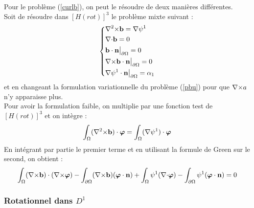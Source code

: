 Pour le problème (\ref{curlb}), on peut le résoudre de deux manières différentes.\\
Soit de résoudre dans $[H(rot)]^3$ le problème mixte suivant : 
\begin{equation}\label{pbbcurl}
\left\{\begin{aligned}
&{\nabla^2\times} \mathbf{b} = {\nabla}\psi^1\\
&{\nabla\cdot} \mathbf{b} = 0\\
&\mathbf{b}\cdot \mathbf{n}{\big\rvert_{\partial\Omega}} = 0\\
&{\nabla\times} \mathbf{b}\cdot \mathbf{n}{\big\rvert_{\partial\Omega}} = 0\\
&{\nabla}\psi^1\cdot \mathbf{n}{\big\rvert_{\partial\Omega}} = \alpha_1
\end{aligned}\right.
\end{equation}
et en changeant la formulation variationnelle du problème (\ref{pbu}) pour que ${\nabla\times} a$ n'y apparaisse plus.\\
Pour avoir la formulation faible, on multiplie par une fonction test de $[H(rot)]^3$ et on intègre :
\[ \int_\Omega ({\nabla^2\times} \mathbf{b})\cdot\bm{\varphi} = \int_\Omega ({\nabla}\psi^1)\cdot\bm{\varphi} \]
En intégrant par partie le premier terme et en utilisant la formule de Green sur le second, on obtient :
\begin{equation} \label{fvbcurl}
\int_\Omega ({\nabla\times} \mathbf{b})\cdot({\nabla\times}\bm{\varphi}) - \int_{\partial\Omega} ({\nabla\times} \mathbf{b})(\bm{\varphi}\cdot \mathbf{n}) + \int_\Omega \psi^1({\nabla\cdot}\bm{\varphi}) - \int_{\partial\Omega} \psi^1(\bm{\varphi}\cdot \mathbf{n}) = 0
\end{equation}

\subsubsection{Rotationnel dans $D^1$}


